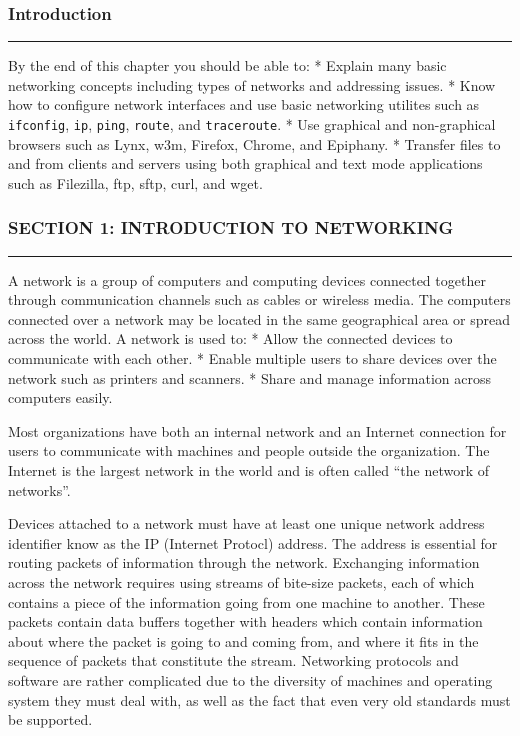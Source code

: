 \subsubsection{Introduction}\label{introduction-11}

\begin{center}\rule{3in}{0.4pt}\end{center}

By the end of this chapter you should be able to: * Explain many basic
networking concepts including types of networks and addressing issues. *
Know how to configure network interfaces and use basic networking
utilites such as \texttt{ifconfig}, \texttt{ip}, \texttt{ping},
\texttt{route}, and \texttt{traceroute}. * Use graphical and
non-graphical browsers such as Lynx, w3m, Firefox, Chrome, and Epiphany.
* Transfer files to and from clients and servers using both graphical
and text mode applications such as Filezilla, ftp, sftp, curl, and wget.

\subsubsection{SECTION 1: INTRODUCTION TO
NETWORKING}\label{section-1-introduction-to-networking}

\begin{center}\rule{3in}{0.4pt}\end{center}

A network is a group of computers and computing devices connected
together through communication channels such as cables or wireless
media. The computers connected over a network may be located in the same
geographical area or spread across the world. A network is used to: *
Allow the connected devices to communicate with each other. * Enable
multiple users to share devices over the network such as printers and
scanners. * Share and manage information across computers easily.

Most organizations have both an internal network and an Internet
connection for users to communicate with machines and people outside the
organization. The Internet is the largest network in the world and is
often called ``the network of networks''.

Devices attached to a network must have at least one unique network
address identifier know as the IP (Internet Protocl) address. The
address is essential for routing packets of information through the
network. Exchanging information across the network requires using
streams of bite-size packets, each of which contains a piece of the
information going from one machine to another. These packets contain
data buffers together with headers which contain information about where
the packet is going to and coming from, and where it fits in the
sequence of packets that constitute the stream. Networking protocols and
software are rather complicated due to the diversity of machines and
operating system they must deal with, as well as the fact that even very
old standards must be supported.

